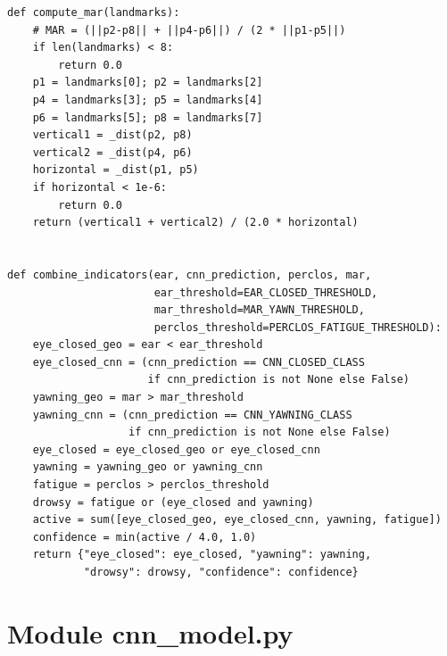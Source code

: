 \documentclass[12pt,a4paper]{report}
\begin{document}
\begin{lstlisting}[style=python, caption={behavioral\_analysis.py -- code complet},
  label=lst:behavioral_full]
def compute_mar(landmarks):
    # MAR = (||p2-p8|| + ||p4-p6||) / (2 * ||p1-p5||)
    if len(landmarks) < 8:
        return 0.0
    p1 = landmarks[0]; p2 = landmarks[2]
    p4 = landmarks[3]; p5 = landmarks[4]
    p6 = landmarks[5]; p8 = landmarks[7]
    vertical1 = _dist(p2, p8)
    vertical2 = _dist(p4, p6)
    horizontal = _dist(p1, p5)
    if horizontal < 1e-6:
        return 0.0
    return (vertical1 + vertical2) / (2.0 * horizontal)


def combine_indicators(ear, cnn_prediction, perclos, mar,
                       ear_threshold=EAR_CLOSED_THRESHOLD,
                       mar_threshold=MAR_YAWN_THRESHOLD,
                       perclos_threshold=PERCLOS_FATIGUE_THRESHOLD):
    eye_closed_geo = ear < ear_threshold
    eye_closed_cnn = (cnn_prediction == CNN_CLOSED_CLASS
                      if cnn_prediction is not None else False)
    yawning_geo = mar > mar_threshold
    yawning_cnn = (cnn_prediction == CNN_YAWNING_CLASS
                   if cnn_prediction is not None else False)
    eye_closed = eye_closed_geo or eye_closed_cnn
    yawning = yawning_geo or yawning_cnn
    fatigue = perclos > perclos_threshold
    drowsy = fatigue or (eye_closed and yawning)
    active = sum([eye_closed_geo, eye_closed_cnn, yawning, fatigue])
    confidence = min(active / 4.0, 1.0)
    return {"eye_closed": eye_closed, "yawning": yawning,
            "drowsy": drowsy, "confidence": confidence}
\end{lstlisting}

\section{Module cnn\_model.py}
\end{document}
